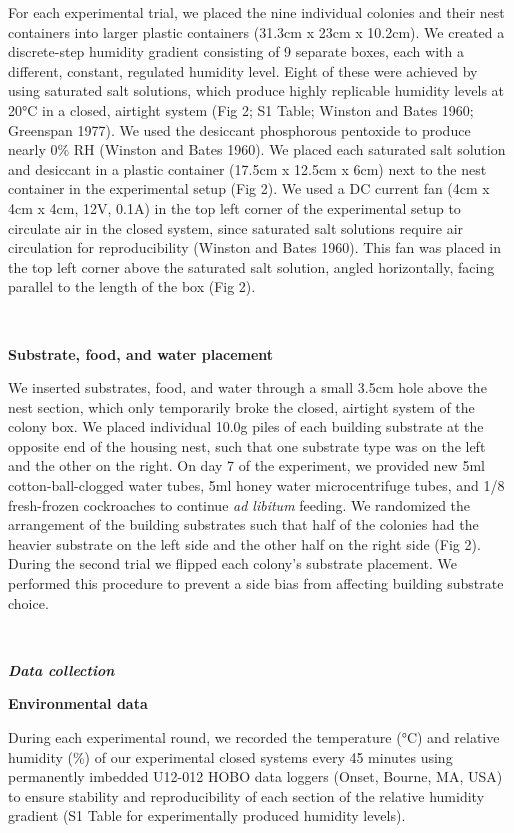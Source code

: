 \documentclass[3p]{elsarticle} %
\begin{document}
For each experimental trial, we placed the nine individual colonies and
their nest containers into larger plastic containers (31.3cm x 23cm x
10.2cm). We created a discrete-step humidity gradient consisting of 9
separate boxes, each with a different, constant, regulated humidity
level. Eight of these were achieved by using saturated salt solutions,
which produce highly replicable humidity levels at 20°C in a closed,
airtight system (Fig 2; S1 Table; Winston and Bates 1960; Greenspan
1977). We used the desiccant phosphorous pentoxide to produce nearly 0\%
RH (Winston and Bates 1960). We placed each saturated salt solution and
desiccant in a plastic container (17.5cm x 12.5cm x 6cm) next to the
nest container in the experimental setup (Fig 2). We used a DC current
fan (4cm x 4cm x 4cm, 12V, 0.1A) in the top left corner of the
experimental setup to circulate air in the closed system, since
saturated salt solutions require air circulation for reproducibility
(Winston and Bates 1960). This fan was placed in the top left corner
above the saturated salt solution, angled horizontally, facing parallel
to the length of the box (Fig 2).

~

\textbf{Substrate, food, and water placement}

We inserted substrates, food, and water through a small 3.5cm hole above
the nest section, which only temporarily broke the closed, airtight
system of the colony box. We placed individual 10.0g piles of each
building substrate at the opposite end of the housing nest, such that
one substrate type was on the left and the other on the right. On day 7
of the experiment, we provided new 5ml cotton-ball-clogged water tubes,
5ml honey water microcentrifuge tubes, and 1/8 fresh-frozen cockroaches
to continue \emph{ad libitum} feeding. We randomized the arrangement of
the building substrates such that half of the colonies had the heavier
substrate on the left side and the other half on the right side (Fig 2).
During the second trial we flipped each colony's substrate placement. We
performed this procedure to prevent a side bias from affecting building
substrate choice.

~

\textbf{\emph{Data collection}}

\textbf{Environmental data}

During each experimental round, we recorded the temperature (°C) and
relative humidity (\%) of our experimental closed systems every 45
minutes using permanently imbedded U12-012 HOBO data loggers (Onset,
Bourne, MA, USA) to ensure stability and reproducibility of each section
of the relative humidity gradient (S1 Table for experimentally produced
humidity levels).
\end{document}
